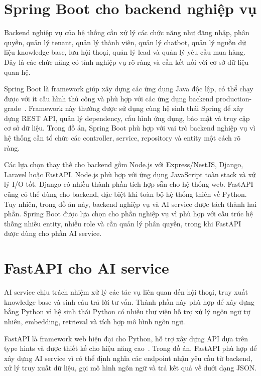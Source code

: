 \documentclass[../DoAn.tex]{subfiles}
\begin{document}
\section{Spring Boot cho backend nghiệp vụ}
\label{section:3.6}

Backend nghiệp vụ của hệ thống cần xử lý các chức năng như đăng nhập, phân quyền, quản lý tenant, quản lý thành viên, quản lý chatbot, quản lý nguồn dữ liệu knowledge base, lưu hội thoại, quản lý lead và quản lý yêu cầu mua hàng. Đây là các chức năng có tính nghiệp vụ rõ ràng và cần kết nối với cơ sở dữ liệu quan hệ.

Spring Boot là framework giúp xây dựng các ứng dụng Java độc lập, có thể chạy được với ít cấu hình thủ công và phù hợp với các ứng dụng backend production-grade~\cite{springboot_docs}. Framework này thường được sử dụng cùng hệ sinh thái Spring để xây dựng REST API, quản lý dependency, cấu hình ứng dụng, bảo mật và truy cập cơ sở dữ liệu. Trong đồ án, Spring Boot phù hợp với vai trò backend nghiệp vụ vì hệ thống cần tổ chức các controller, service, repository và entity một cách rõ ràng.

Các lựa chọn thay thế cho backend gồm Node.js với Express/NestJS, Django, Laravel hoặc FastAPI. Node.js phù hợp với ứng dụng JavaScript toàn stack và xử lý I/O tốt. Django có nhiều thành phần tích hợp sẵn cho hệ thống web. FastAPI cũng có thể dùng cho backend, đặc biệt khi toàn bộ hệ thống thiên về Python. Tuy nhiên, trong đồ án này, backend nghiệp vụ và AI service được tách thành hai phần. Spring Boot được lựa chọn cho phần nghiệp vụ vì phù hợp với cấu trúc hệ thống nhiều entity, nhiều role và cần quản lý phân quyền, trong khi FastAPI được dùng cho phần AI service.

\section{FastAPI cho AI service}
\label{section:3.7}

AI service chịu trách nhiệm xử lý các tác vụ liên quan đến hội thoại, truy xuất knowledge base và sinh câu trả lời tư vấn. Thành phần này phù hợp để xây dựng bằng Python vì hệ sinh thái Python có nhiều thư viện hỗ trợ xử lý ngôn ngữ tự nhiên, embedding, retrieval và tích hợp mô hình ngôn ngữ.

FastAPI là framework web hiện đại cho Python, hỗ trợ xây dựng API dựa trên type hints và được thiết kế cho hiệu năng cao~\cite{fastapi_docs}. Trong đồ án, FastAPI phù hợp để xây dựng AI service vì có thể định nghĩa các endpoint nhận yêu cầu từ backend, xử lý truy xuất dữ liệu, gọi mô hình ngôn ngữ và trả kết quả về dưới dạng JSON.
\end{document}
